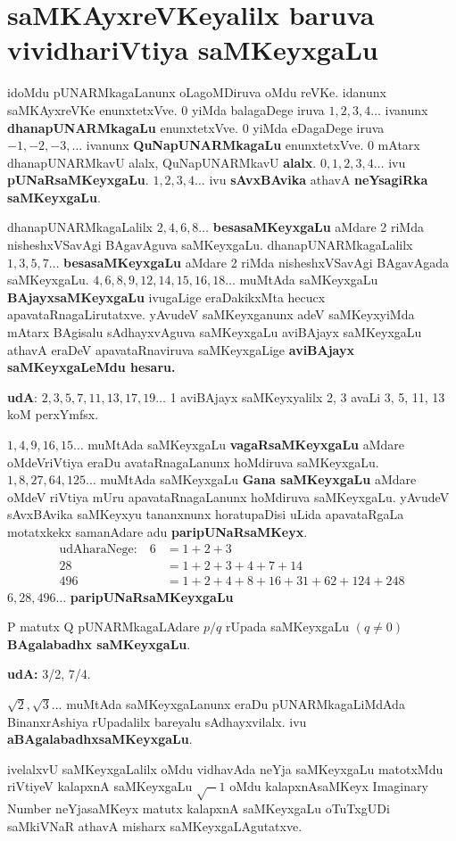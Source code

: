 \chapter{saMKAyxreVKeyalilx baruva vividhariVtiya saMKeyxgaLu}

\begin{figure}[!h]
\end{figure}
idoMdu pUNARMkagaLanunx oLagoMDiruva oMdu reVKe. idanunx saMKAyxreVKe enunxtetxVve.
$0$ yiMda balagaDege iruva $1,2,3,4\ldots$ ivanunx \textbf{dhanapUNARMkagaLu} enunxtetxVve.
$0$ yiMda eDagaDege iruva $-1, -2, -3, \ldots$ ivanunx \textbf{QuNapUNARMkagaLu} enunxtetxVve.
$0$ mAtarx dhanapUNARMkavU alalx, QuNapUNARMkavU \textbf{alalx}.
$0, 1, 2, 3, 4\ldots$ ivu \textbf{pUNaRsaMKeyxgaLu}.
$1, 2, 3, 4\ldots$ ivu \textbf{sAvxBAvika} athavA \textbf{neYsagiRka saMKeyxgaLu}.

dhanapUNARMkagaLalilx $2, 4, 6, 8\ldots$ \textbf{besasaMKeyxgaLu} aMdare {\rm 2} riMda nisheshxVSavAgi BAgavAguva saMKeyxgaLu.
dhanapUNARMkagaLalilx $1, 3, 5, 7\ldots$ \textbf{besasaMKeyxgaLu} aMdare {\rm 2} riMda nisheshxVSavAgi BAgavAgada saMKeyxgaLu.
$4, 6, 8, 9, 12, 14, 15, 16, 18\ldots$ muMtAda saMKeyxgaLu \textbf{BAjayxsaMKeyxgaLu} ivugaLige eraDakikxMta hecucx apavataRnagaLiru\-tatxve.
yAvudeV saMKeyxganunx adeV saMKeyxyiMda mAtarx BAgisalu sAdhayxvAguva saMKeyxgaLu aviBAjayx saMKeyxgaLu athavA eraDeV apavataRnaviruva saMKeyxgaLige \textbf{aviBAjayx saMKeyxgaLeMdu hesaru.}

\textbf{udA}: $2, 3, 5, 7, 11, 13, 17, 19 \ldots$ {\rm 1} aviBAjayx saMKeyxyalilx {\rm 2, 3} avaLi {\-\rm 3, 5}, {\rm 11, 13} koM perxYmfsx.

$1, 4, 9, 16, 15\ldots$ muMtAda saMKeyxgaLu \textbf{vagaRsaMKeyxgaLu} aMdare oMdeV\break riVtiya eraDu avataRnagaLanunx hoMdiruva saMKeyxgaLu.
$1, 8, 27, 64, 125\ldots$ muMtAda saMKeyxgaLu \textbf{Gana saMKeyxgaLu} aMdare oMdeV riVtiya mUru apavataRna\-gaLanunx hoMdiruva saMKeyxgaLu.
yAvudeV sAvxBAvika saMKeyxyu tananxnunx horatupaDisi uLida apavataRgaLa motatxkekx samanAdare adu \textbf{paripUNaRsaMKeyx}.
\begin{align*}
\text{udAharaNege:}\quad  6 &= 1+2+3\\
28 &= 1+2+3+4+7+14\\
496 &= 1+2+4+8+16+31+62+124+248
\end{align*} 
$6,28,496\ldots$ \textbf{paripUNaRsaMKeyxgaLu}

{\rm P} matutx {\rm Q} pUNARMkagaLAdare $p/q$ rUpada saMKeyxgaLu $(q\neq 0)$ \textbf{BAgalabadhx saMKeyxgaLu}.

\textbf{udA:} {\rm 3/2, 7/4}.

${\sqrt 2}, {\sqrt 3}\ldots$ muMtAda saMKeyxgaLanunx eraDu pUNARMkagaLiMdAda Binanx\-rAshiya rUpadalilx bareyalu sAdhayxvilalx. ivu \textbf{aBAgalabadhxsaMKeyxgaLu}.

ivelalxvU saMKeyxgaLalilx oMdu vidhavAda neYja saMKeyxgaLu matotxMdu riVtiyeV kalapxnA  saMKeyxgaLu $\sqrt-1$ oMdu kalapxnAsaMKeyx {\rm Imaginary Number} neYjasaMKeyx matutx kalapxnA saMKeyxgaLu oTuTxgUDi saMkiVNaR athavA misharx saMKeyxgaLAgutatxve. 
